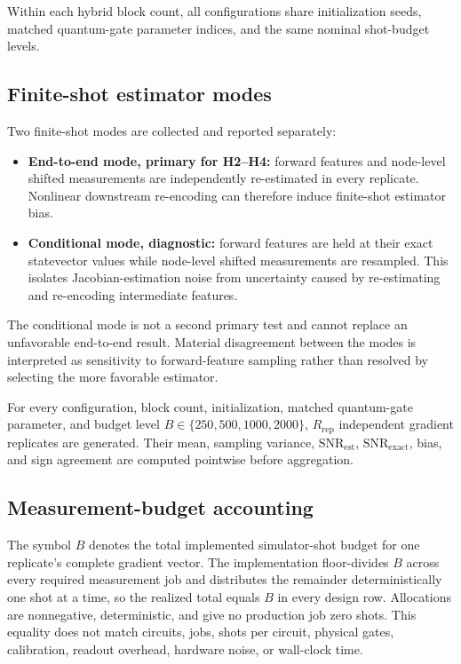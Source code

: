 \documentclass[pdflatex,sn-basic,Numbered]{sn-jnl}
\newcommand{\snrest}{\mathrm{SNR}_{\mathrm{est}}}
\newcommand{\snrexact}{\mathrm{SNR}_{\mathrm{exact}}}
\begin{document}
Within each hybrid block count, all configurations share initialization seeds, matched quantum-gate parameter indices, and the same nominal shot-budget levels.

\subsection{Finite-shot estimator modes}

Two finite-shot modes are collected and reported separately:

\begin{itemize}
\item \textbf{End-to-end mode, primary for H2--H4:} forward features and node-level shifted measurements are independently re-estimated in every replicate. Nonlinear downstream re-encoding can therefore induce finite-shot estimator bias.
\item \textbf{Conditional mode, diagnostic:} forward features are held at their exact statevector values while node-level shifted measurements are resampled. This isolates Jacobian-estimation noise from uncertainty caused by re-estimating and re-encoding intermediate features.
\end{itemize}

The conditional mode is not a second primary test and cannot replace an unfavorable end-to-end result. Material disagreement between the modes is interpreted as sensitivity to forward-feature sampling rather than resolved by selecting the more favorable estimator.

For every configuration, block count, initialization, matched quantum-gate parameter, and budget level $B\in\{250,500,1000,2000\}$, $R_{\mathrm{rep}}$ independent gradient replicates are generated. Their mean, sampling variance, $\snrest$, $\snrexact$, bias, and sign agreement are computed pointwise before aggregation.

\subsection{Measurement-budget accounting}
\label{sec:budget}

The symbol $B$ denotes the total implemented simulator-shot budget for one replicate's complete gradient vector. The implementation floor-divides $B$ across every required measurement job and distributes the remainder deterministically one shot at a time, so the realized total equals $B$ in every design row. Allocations are nonnegative, deterministic, and give no production job zero shots. This equality does not match circuits, jobs, shots per circuit, physical gates, calibration, readout overhead, hardware noise, or wall-clock time.
\end{document}
